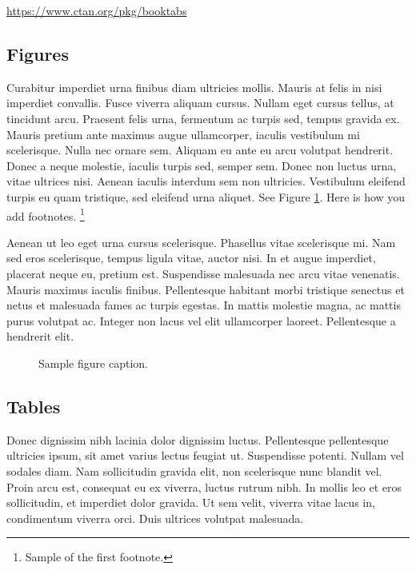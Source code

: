 \documentclass{article}
\begin{document}
\begin{center}
  \url{https://www.ctan.org/pkg/booktabs}
\end{center}


\subsection{Figures}
Curabitur imperdiet urna finibus diam ultricies mollis. Mauris at felis in nisi imperdiet convallis. Fusce viverra aliquam cursus. Nullam eget cursus tellus, at tincidunt arcu. Praesent felis urna, fermentum ac turpis sed, tempus gravida ex. Mauris pretium ante maximus augue ullamcorper, iaculis vestibulum mi scelerisque. Nulla nec ornare sem. Aliquam eu ante eu arcu volutpat hendrerit. Donec a neque molestie, iaculis turpis sed, semper sem. Donec non luctus urna, vitae ultrices nisi. Aenean iaculis interdum sem non ultricies. Vestibulum eleifend turpis eu quam tristique, sed eleifend urna aliquet. 
See Figure \ref{fig:fig2}. Here is how you add footnotes. \footnote{Sample of the first footnote.}


Aenean ut leo eget urna cursus scelerisque. Phasellus vitae scelerisque mi. Nam sed eros scelerisque, tempus ligula vitae, auctor nisi. In et augue imperdiet, placerat neque eu, pretium est. Suspendisse malesuada nec arcu vitae venenatis. Mauris maximus iaculis finibus. Pellentesque habitant morbi tristique senectus et netus et malesuada fames ac turpis egestas. In mattis molestie magna, ac mattis purus volutpat ac. Integer non lacus vel elit ullamcorper laoreet. Pellentesque a hendrerit elit. 

\begin{figure}
  \centering
  \fbox{\rule[-.5cm]{4cm}{4cm} \rule[-.5cm]{4cm}{0cm}}
  \caption{Sample figure caption.}
  \label{fig:fig2}
\end{figure}

\subsection{Tables}
Donec dignissim nibh lacinia dolor dignissim luctus. Pellentesque pellentesque ultricies ipsum, sit amet varius lectus feugiat ut. Suspendisse potenti. Nullam vel sodales diam. Nam sollicitudin gravida elit, non scelerisque nunc blandit vel. Proin arcu est, consequat eu ex viverra, luctus rutrum nibh. In mollis leo et eros sollicitudin, et imperdiet dolor gravida. Ut sem velit, viverra vitae lacus in, condimentum viverra orci. Duis ultrices volutpat malesuada. 
\end{document}
